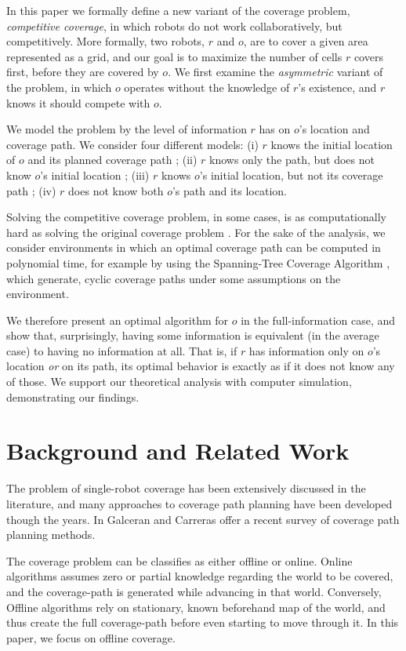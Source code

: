 \documentclass[a4paper,english,10pt]{article}
\newcommand\rob{\ensuremath{r}\xspace}
\newcommand\opp{\ensuremath{o}\xspace}
\begin{document}
In this paper we formally define a new variant of the coverage problem, {\em competitive coverage}, in which robots do not work collaboratively, but competitively. More formally, two robots, \rob and \opp, are to cover a given area represented as a grid, and our goal is to maximize the number of cells \rob covers first, before they are covered by \opp. We first examine the {\em asymmetric} variant of the problem, in which \opp operates without the knowledge of \rob's existence, and \rob knows it should compete with \opp. 

We model the problem by the level of information \rob has on \opp's location and coverage path. We consider four different models: (i) \rob knows the initial location of \opp and its planned coverage path ; (ii) \rob knows only the path, but does not know \opp's initial location ; (iii) \rob knows \opp's initial location, but not its coverage path ; (iv) \rob does not know both \opp's path and its location.

Solving the competitive coverage problem, in some cases, is as computationally hard as solving the original coverage problem \cite{arkin2000approximation}. For the sake of the analysis, we consider environments in which an optimal coverage path can be computed in polynomial time, for example by using the Spanning-Tree Coverage Algorithm \cite{gabriely2001spanning}, which generate, cyclic coverage paths under some assumptions on the environment. 

We therefore present an optimal algorithm for \opp in the full-information case, and show that, surprisingly, having some information is equivalent (in the average case) to having no information at all. That is, if \rob has information only on \opp's location {\em or} on its path, its optimal behavior is exactly as if it does not know any of those. We support our theoretical analysis with computer simulation, demonstrating our findings. 

\section{Background and Related Work}

The problem of single-robot coverage has been extensively discussed in the literature, and many approaches to coverage path planning have been developed though the years. In \cite{galceran2013survey} Galceran and Carreras offer a recent survey of coverage path planning methods.

The coverage problem can be classifies as either offline or online. 
Online algorithms assumes zero or partial knowledge regarding the world to be covered, and the coverage-path is generated while advancing in that world. Conversely, Offline algorithms rely on stationary, known beforehand map of the world, and thus create the full coverage-path before even starting to move through it. In this paper, we focus on offline coverage.
\end{document}
